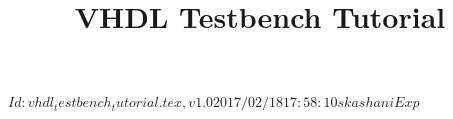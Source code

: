 \documentclass[lab]{course}
\begin{document}
\lstset{language=VHDL}
\lstset{showstringspaces=false}
\lstset{captionpos=b}

\makeatletter
\newenvironment{btHighlight}[1][]
{\begingroup\tikzset{bt@Highlight@par/.style={#1}}\begin{lrbox}{\@tempboxa}}
{\end{lrbox}\bt@HL@box[bt@Highlight@par]{\@tempboxa}\endgroup}

\newcommand\btHL[1][]{%
  \begin{btHighlight}[#1]\bgroup\aftergroup\bt@HL@endenv%
}
\def\bt@HL@endenv{%
  \end{btHighlight}%
  \egroup
}
\newcommand{\bt@HL@box}[2][]{%
  \tikz[#1]{%
    \pgfpathrectangle{\pgfpoint{1pt}{0pt}}{\pgfpoint{\wd #2}{\ht #2}}%
    \pgfusepath{use as bounding box}%
    \node[anchor=base west, fill=orange!30,outer sep=0pt,inner xsep=1pt, inner ysep=0pt, rounded corners=3pt, minimum height=\ht\strutbox+1pt,#1]{\raisebox{1pt}{\strut}\strut\usebox{#2}};
  }%
}
\makeatother

\setlength\parindent{0pt}

\rcsInfo $Id: vhdl_testbench_tutorial.tex,v 1.0 2017/02/18 17:58:10 skashani Exp $

\title{%
  VHDL Testbench Tutorial}
\subtitle{%
  }
\maketitle

\sloppy %

\end{document}
